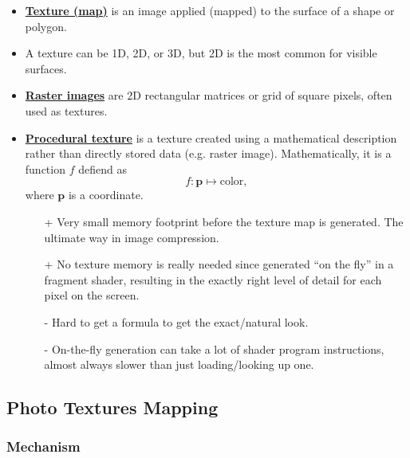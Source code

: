 \documentclass[twocolumn,landscape,10pt]{article}
\theoremstyle{definition}
\begin{document}
\begin{itemize}
    \item \underline{\textbf{Texture (map)}} is an image applied (mapped)
        to the surface of a shape or polygon.
    \item A texture can be 1D, 2D, or 3D, but 2D is the most common for visible
        surfaces.
    \item \underline{\textbf{Raster images}} are 2D rectangular matrices or grid
        of square pixels, often used as textures.
    \item \underline{\textbf{Procedural texture}} is a texture created using a
        mathematical description rather than directly stored data 
        (e.g. raster image). Mathematically, it is a function $f$ defiend as
        \[
            f:\mathbf{p}\mapsto\text{color},
        \]
        where $\mathbf{p}$ is a coordinate.
        \begin{itemize}
            \item[+] Very small memory footprint before the texture map is
                generated. The ultimate way in image compression.
            \item[+] No texture memory is really needed since generated ``on the
                fly'' in a fragment shader, resulting in the exactly right level
                of detail for each pixel on the screen.
            \item[-] Hard to get a formula to get the exact/natural look.
            \item[-] On-the-fly generation can take a lot of shader
                program instructions, almost always slower than just
                loading/looking up one.
        \end{itemize} 
\end{itemize} 

\subsection{Photo Textures Mapping}

\subsubsection{Mechanism}
\end{document}
